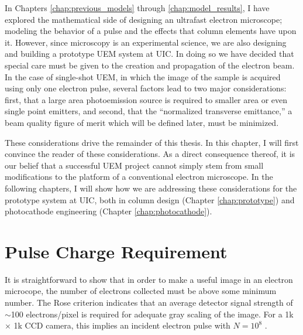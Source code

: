 
In Chapters \ref{chap:previous_models} through \ref{chap:model_results}, I have explored the mathematical side of designing an ultrafast electron microscope; modeling the behavior of a pulse and the effects that column elements have upon it.
However, since microscopy is an experimental science, we are also designing and building a prototype UEM system at UIC.
In doing so we have decided that special care must be given to the creation and propagation of the electron beam.
In the case of single-shot UEM, in which the image of the sample is acquired using only one electron pulse, several factors lead to two major considerations: first, that a large area photoemission source is required to smaller area or even single point emitters, and second, that the ``normalized transverse emittance,'' a beam quality figure of merit which will be defined later, must be minimized.

These considerations drive the remainder of this thesis.
In this chapter, I will first convince the reader of these considerations.
As a direct consequence thereof, it is our belief that a successful UEM project cannot simply stem from small modifications to the platform of a conventional electron microscope.
In the following chapters, I will show how we are addressing these considerations for the prototype system at UIC, both in column design (Chapter \ref{chap:prototype}) and photocathode engineering (Chapter \ref{chap:photocathode}).

\section{Pulse Charge Requirement}

It is straightforward to show that in order to make a useful image in an electron microcope, the number of electrons collected must be above some minimum number.
The Rose criterion \cite{rose_television_1948} indicates that an average detector signal strength of $\sim$100 electrons/pixel is required for adequate gray scaling of the image.
For a 1k $\times$ 1k CCD camera, this implies an incident electron pulse with $N=10^8$ \cite{armstrong_prospects_2007}.

